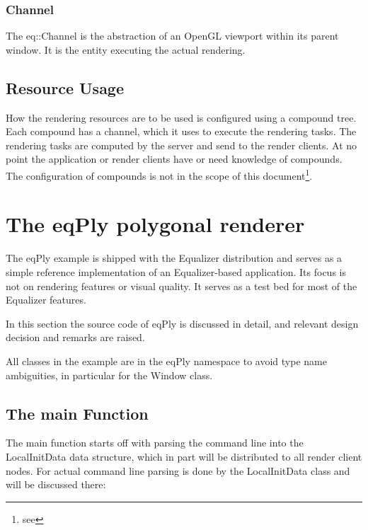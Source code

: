 \documentclass[10pt,a4]{scrartcl}
\begin{document}
\subsubsection{Channel}

The \textsf{eq::Channel} is the abstraction of an OpenGL viewport within
its parent window. It is the entity executing the actual rendering.


\subsection{Resource Usage}

How the rendering resources are to be used is configured using a
compound tree. Each compound has a channel, which it uses to execute the
rendering tasks. The rendering tasks are computed by the server and send
to the render clients. At no point the application or render clients
have or need knowledge of compounds. The configuration of compounds is
not in the scope of this document\footnote{see
  }.



\section{The \textsf{eqPly} polygonal renderer}

The \textsf{eqPly} example is shipped with the Equalizer distribution
and serves as a simple reference implementation of an Equalizer-based
application. Its focus is not on rendering features or visual quality.
It serves as a test bed for most of the Equalizer features.

In this section the source code of \textsf{eqPly} is discussed in
detail, and relevant design decision and remarks are raised.

All classes in the example are in the \textsf{eqPly} namespace to avoid
type name ambiguities, in particular for the \textsf{Window} class.


\subsection{The main Function}

The main function starts off with parsing the command line into the
\textsf{LocalInitData} data structure, which in part will be distributed
to all render client nodes. For actual command line parsing is done by
the \textsf{LocalInitData} class and will be discussed there:
\end{document}
